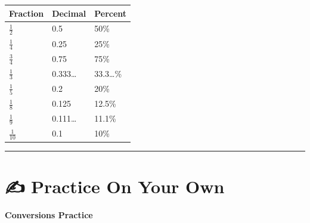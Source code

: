 \documentclass[
  letterpaper,
  DIV=11,
  numbers=noendperiod]{scrreprt}
\begin{document}
\begin{longtable}[]{@{}lll@{}}
\toprule\noalign{}
Fraction & Decimal & Percent \\
\midrule\noalign{}
\endhead
\bottomrule\noalign{}
\endlastfoot
\(\frac{1}{2}\) & 0.5 & 50\% \\
\(\frac{1}{4}\) & 0.25 & 25\% \\
\(\frac{3}{4}\) & 0.75 & 75\% \\
\(\frac{1}{3}\) & 0.333\ldots{} & 33.3\ldots\% \\
\(\frac{1}{5}\) & 0.2 & 20\% \\
\(\frac{1}{8}\) & 0.125 & 12.5\% \\
\(\frac{1}{9}\) & 0.111\ldots{} & 11.1\% \\
\(\frac{1}{10}\) & 0.1 & 10\% \\
\end{longtable}

\begin{center}\rule{0.5\linewidth}{0.5pt}\end{center}

\section*{✍️ Practice On Your Own}\label{practice-on-your-own-3}


\textbf{Conversions Practice}
\end{document}
